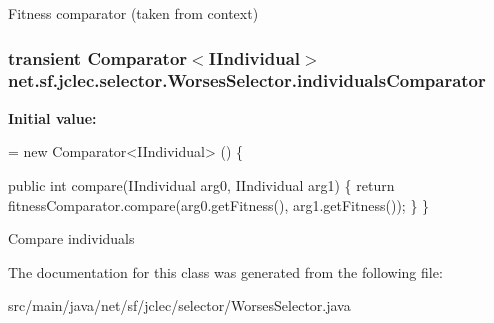 Fitness comparator (taken from context) \hypertarget{classnet_1_1sf_1_1jclec_1_1selector_1_1_worses_selector_a0a02abaad7e94b3c69d0d357616563cc}{
\subsubsection[{individuals\-Comparator}]{\setlength{\rightskip}{0pt plus 5cm}transient Comparator$<${\bf I\-Individual}$>$ net.\-sf.\-jclec.\-selector.\-Worses\-Selector.\-individuals\-Comparator\hspace{0.3cm}{\ttfamily [protected]}}}\label{classnet_1_1sf_1_1jclec_1_1selector_1_1_worses_selector_a0a02abaad7e94b3c69d0d357616563cc}
{\bfseries Initial value\-:}
\begin{DoxyCode}
=  
        \textcolor{keyword}{new} Comparator<IIndividual> () 
        \{
            
        
            \textcolor{keyword}{public} \textcolor{keywordtype}{int} compare(IIndividual arg0, IIndividual arg1) \{
                \textcolor{keywordflow}{return} fitnessComparator.compare(arg0.getFitness(), arg1.getFitness());
            \}
        \}
\end{DoxyCode}
Compare individuals 

The documentation for this class was generated from the following file\-:\begin{DoxyCompactItemize}
\item 
src/main/java/net/sf/jclec/selector/Worses\-Selector.\-java\end{DoxyCompactItemize}
